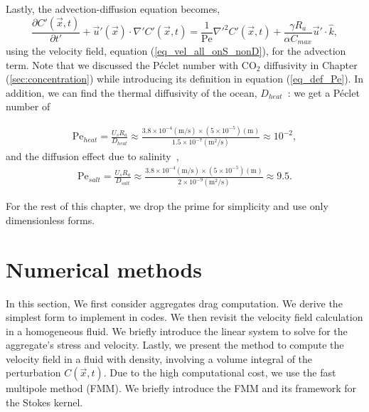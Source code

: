 \par
Lastly, the advection-diffusion equation becomes, 
	\begin{equation}
	\frac{\partial C'(\vec{x},t)}{\partial t'}
	+ \vec{u}'(\vec{x}) \cdot \nabla' C'(\vec{x},t)
	 = \frac{1}{\textrm{Pe}} {\nabla'}^2 C'(\vec{x},t)
	 +\frac{\gamma R_a}{ \alpha C_{max}} \vec{u}' \cdot \hat{k},
	\label{eq_AD_nonD}
	\end{equation}
using the velocity field, equation (\ref{eq_vel_all_onS_nonD}), for the advection term.
Note that we discussed the Péclet number with CO$_2$ diffusivity in Chapter (\ref{sec:concentration}) while introducing its definition in equation (\ref{eq_def_Pe}).
In addition, we can find the thermal diffusivity of the ocean, $D_{heat}$~\cite{nayar_thermophysical_2016,sharqawy_thermophysical_2010}: we get a Péclet number of

\begin{align}
	\text{Pe}_{heat} 
	= \frac{U_s R_a }{D_{heat}} 
	\approx \frac{3.8 \times 10^{-4}(\text{m/s}) \times \left(5 \times 10^{-5} \right) (\text{m})}{1.5 \times 10^{-7} (\text{m}^2\text{/s})} \approx 10^{-2},
\end{align} 
and the diffusion effect due to salinity~\cite{wollast_diffusion_1971}, 
\begin{align}
	\text{Pe}_{salt}
	= \frac{U_s R_a }{D_{salt}} 
	\approx \frac{3.8 \times 10^{-4}(\text{m/s}) \times \left(5 \times 10^{-5} \right) (\text{m})}{ 2\times 10^{-9} (\text{m}^2\text{/s})} \approx 9.5.
\end{align}
\par
For the rest of this chapter, we drop the prime for simplicity and use only dimensionless forms. 


\section{Numerical methods}
In this section, 
We first consider aggregates drag computation. We derive the simplest form to implement in codes. We then revisit the velocity field calculation in a homogeneous fluid. We briefly introduce the linear system to solve for the aggregate's stress and velocity. Lastly, we present the method to compute the velocity field in a fluid with density, involving a volume integral of the perturbation $C(\vec{x},t)$. Due to the high computational cost, we use the fast multipole method (FMM). We briefly introduce the FMM and its framework for the Stokes kernel.

